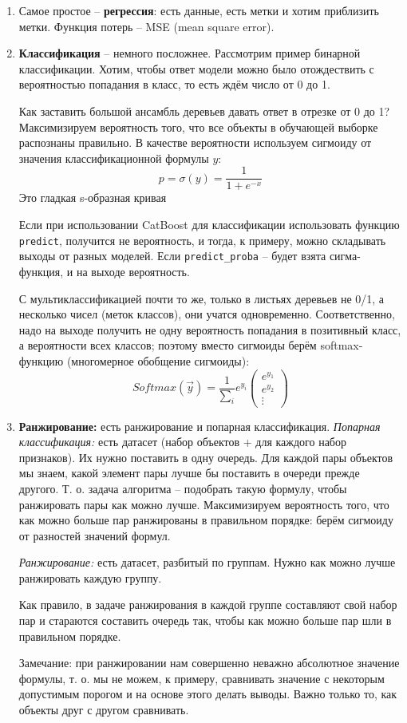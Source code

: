 \documentclass[a4paper,12pt]{article}
\begin{document}
\begin{enumerate}[noitemsep]
    \item Самое простое -- \textbf{регрессия}: есть данные, есть метки и хотим приблизить метки.
    Функция потерь -- MSE (mean square error).
    \item \textbf{Классификация} -- немного посложнее.
    Рассмотрим пример бинарной классификации.
    Хотим, чтобы ответ модели можно было отождествить с вероятностью попадания в класс, то есть ждём число от 0 до 1.

    Как заставить большой ансамбль деревьев давать ответ в отрезке от 0 до 1?
    Максимизируем вероятность того, что все объекты в обучающей выборке распознаны правильно.
    В качестве вероятности используем сигмоиду от значения классификационной формулы $y$:
    $$ p = \sigma(y) = \frac{1}{1+e^{-x}} $$
    Это гладкая s-образная кривая
    

    \begin{leftbar}
        Если при использовании CatBoost для классификации использовать функцию \texttt{predict}, получится не вероятность, и тогда, к примеру, можно складывать выходы от разных моделей.
        Если \texttt{predict\_proba} -- будет взята сигма-функция, и на выходе вероятность.
    \end{leftbar}
    С мультиклассификацией почти то же, только в листьях деревьев не 0/1, а несколько чисел (меток классов), они учатся одновременно.
    Соответственно, надо на выходе получить не одну вероятность попадания в позитивный класс, а вероятности всех классов; поэтому вместо сигмоиды берём softmax-функцию (многомерное обобщение сигмоиды):
    $$ Softmax(\vec y) = \frac{1}{\sum_i} e^{y_i} \begin{pmatrix} e^{y_1} \\ e^{y_2} \\ \vdots \end{pmatrix} $$

    \item \textbf{Ранжирование:} есть ранжирование и попарная классификация.
    \textit{Попарная классификация:} есть датасет (набор объектов + для каждого набор признаков). Их нужно поставить в одну очередь. Для каждой пары объектов мы знаем, какой элемент пары лучше бы поставить в очереди прежде другого.
    Т. о. задача алгоритма -- подобрать такую формулу, чтобы ранжировать пары как можно лучше.
    Максимизируем вероятность того, что как можно больше пар ранжированы в правильном порядке: берём сигмоиду от разностей значений формул.

    \textit{Ранжирование:} есть датасет, разбитый по группам.
    Нужно как можно лучше ранжировать каждую группу.

    Как правило, в задаче ранжирования в каждой группе составляют свой набор пар и стараются составить очередь так, чтобы как можно больше пар шли в правильном порядке.

    Замечание: при ранжировании нам совершенно неважно абсолютное значение формулы, т. о. мы не можем, к примеру, сравнивать значение с некоторым допустимым порогом и на основе этого делать выводы.
    Важно только то, как объекты друг с другом сравнивать.
\end{enumerate}
\end{document}
